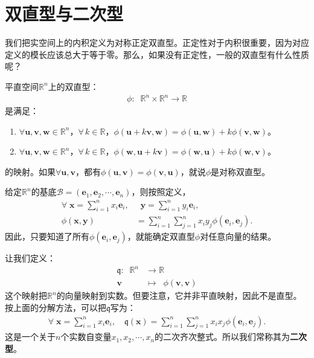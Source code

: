 \documentclass[12pt,UTF8]{ctexbook}
\begin{document}
\section{双直型与二次型}
我们把实空间上的内积定义为对称正定双直型。正定性对于内积很重要，因为对应定义的模长应该总大于等于零。那么，如果没有正定性，一般的双直型有什么性质呢？

\begin{df}
平直空间$\mathbb{R}^n$上的双直型：
\begin{align*}
    \phi:\;\;\mathbb{R}^n \times \mathbb{R}^n \rightarrow \mathbb{R}      
\end{align*}
是满足：
\begin{enumerate}
    \item $\forall \mathbf{u}, \mathbf{v}, \mathbf{w} \in \mathbb{R}^n$，$\forall \, k \in \mathbb{R}$，$\phi(\mathbf{u} + k\mathbf{v}, \mathbf{w}) = \phi(\mathbf{u}, \mathbf{w}) + k \phi(\mathbf{v}, \mathbf{w})$。
    \item $\forall \mathbf{u}, \mathbf{v}, \mathbf{w} \in \mathbb{R}^n$，$\forall \, k \in \mathbb{R}$，$\phi(\mathbf{w}, \mathbf{u} + k\mathbf{v}) = \phi(\mathbf{w},\mathbf{u}) + k \phi(\mathbf{w},\mathbf{v})$。
\end{enumerate}
的映射。如果$\forall \mathbf{u}, \mathbf{v}$，都有$\phi(\mathbf{u}, \mathbf{v}) = \phi(\mathbf{v}, \mathbf{u})$，就说$\phi$是对称双直型。
\end{df}

给定$\mathbb{R}^n$的基底$\mathcal{B} = (\mathbf{e}_1, \mathbf{e}_2, \cdots, \mathbf{e}_n)$，则按照定义，
\begin{align*}
    \forall \;\mathbf{x} = \sum_{i=1}^n x_i\mathbf{e}_i,& \;\;\mathbf{y} = \sum_{i=1}^n y_i\mathbf{e}_i, \\
    \phi(\mathbf{x},\mathbf{y}) &= \sum_{i=1}^n\sum_{j=1}^n x_i y_j \phi(\mathbf{e}_i,\mathbf{e}_j).
\end{align*}
因此，只要知道了所有$\phi(\mathbf{e}_i,\mathbf{e}_j)$，就能确定双直型$\phi$对任意向量的结果。

让我们定义：
\begin{align*}
    \mathfrak{q}:\;\;\mathbb{R}^n  &\rightarrow \mathbb{R}  \\
            \mathbf{v}\;\; &\mapsto \;\; \phi(\mathbf{v}, \mathbf{v})
\end{align*}
这个映射把$\mathbb{R}^n$的向量映射到实数。但要注意，它并非平直映射，因此不是直型。按上面的分解方法，可以把$\mathfrak{q}$写为：
\begin{align*}
    \forall \;\mathbf{x} = \sum_{i=1}^n x_i\mathbf{e}_i,\quad \mathfrak{q}(\mathbf{x}) = \sum_{i=1}^n\sum_{j=1}^n x_i x_j \phi(\mathbf{e}_i,\mathbf{e}_j).
\end{align*}
这是一个关于$n$个实数自变量$x_1,x_2,\cdots,x_n$的二次齐次整式。所以我们常称其为\textbf{二次型}。
\end{document}
